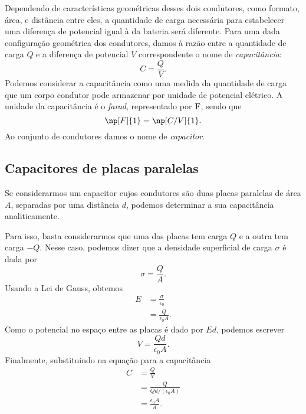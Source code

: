 Dependendo de características geométricas desses dois condutores, como formato, área, e distância entre eles, a quantidade de carga necessária para estabelecer uma diferença de potencial igual à da bateria será diferente. Para uma dada configuração geométrica dos condutores, damos à razão entre a quantidade de carga $Q$ e a diferença de potencial $V$ correspondente o nome de \emph{capacitância}:
\begin{equation}\label{Eq:DefCapacitancia}
	C = \frac{Q}{V}.
\end{equation}
%
Podemos considerar a capacitância como uma medida da quantidade de carga que um corpo condutor pode armazenar por unidade de potencial elétrico. A unidade da capacitância é o \emph{farad}, representado por $\rm{F}$, sendo que
\begin{equation}
	\np[F]{1} = \np[C/V]{1}.
\end{equation}
%
Ao conjunto de condutores damos o nome de \emph{capacitor}.

\subsection{Capacitores de placas paralelas}

Se considerarmos um capacitor cujos condutores são duas placas paralelas de área $A$, separadas por uma distância $d$, podemos determinar a sua capacitância analiticamente.

Para isso, basta considerarmos que uma das placas tem carga $Q$ e a outra tem carga $-Q$. Nesse caso, podemos dizer que a densidade superficial de carga $\sigma$ é dada por
\begin{equation}
	\sigma = \frac{Q}{A}.
\end{equation}
%
Usando a Lei de Gauss, obtemos
\begin{align}
	E &= \frac{\sigma}{\epsilon_0} \\
	&= \frac{Q}{\epsilon_0 A}.
\end{align}
%
Como o potencial no espaço entre as placas é dado por $Ed$, podemos escrever
\begin{equation}
	V = \frac{Qd}{\epsilon_0 A}.
\end{equation}
%
Finalmente, substituindo na equação para a capacitância
\begin{align}
	C &= \frac{Q}{V} \\
	&= \frac{Q}{Qd/(\epsilon_0 A)} \\
	&= \frac{\epsilon_0 A}{d}.
\end{align}

